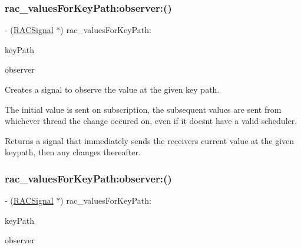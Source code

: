 \subsubsection{\texorpdfstring{rac\+\_\+values\+For\+Key\+Path\+:observer\+:()}{rac\_valuesForKeyPath:observer:()}\hspace{0.1cm}{\footnotesize\ttfamily [1/3]}}
{\footnotesize\ttfamily -\/ (\mbox{\hyperlink{interface_r_a_c_signal}{R\+A\+C\+Signal}} $\ast$) rac\+\_\+values\+For\+Key\+Path\+: \begin{DoxyParamCaption}\item[{(N\+S\+String $\ast$)}]{key\+Path }\item[{observer:(\+\_\+\+\_\+weak N\+S\+Object $\ast$)}]{observer }\end{DoxyParamCaption}}

Creates a signal to observe the value at the given key path.

The initial value is sent on subscription, the subsequent values are sent from whichever thread the change occured on, even if it doesn\textquotesingle{}t have a valid scheduler.

Returns a signal that immediately sends the receiver\textquotesingle{}s current value at the given keypath, then any changes thereafter. \mbox{\label{category_n_s_object_07_r_a_c_property_subscribing_08_aa2bf4263a7bab7e6d3223687806cfa4e}} 
\subsubsection{\texorpdfstring{rac\+\_\+values\+For\+Key\+Path\+:observer\+:()}{rac\_valuesForKeyPath:observer:()}\hspace{0.1cm}{\footnotesize\ttfamily [2/3]}}
{\footnotesize\ttfamily -\/ (\mbox{\hyperlink{interface_r_a_c_signal}{R\+A\+C\+Signal}} $\ast$) rac\+\_\+values\+For\+Key\+Path\+: \begin{DoxyParamCaption}\item[{(N\+S\+String $\ast$)}]{key\+Path }\item[{observer:(\+\_\+\+\_\+weak N\+S\+Object $\ast$)}]{observer }\end{DoxyParamCaption}}

